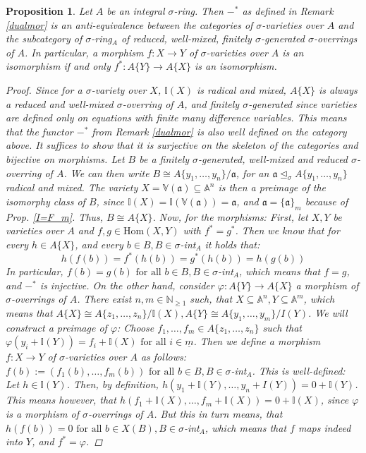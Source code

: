 \documentclass{article}
\def\I{\mathbb{I}}
\def\NE{\mathbb{N}_{\geq1}}
\def\VV{\mathbb{V}}
\def\a{\mathfrak{a}}
\def\s{\sigma}
\def\si{\unlhd_{\sigma}}
\def\Hom{\text{Hom}}
\def\fa{\text{ for all }}
\newenvironment{bew}{\begin{proof}[Proof]}{\end{proof}}
\theoremstyle{plain}
\newtheorem{prop}[Satz]{Proposition}
\theoremstyle{definition}
\begin{document}
\begin{prop}\label{dualisequiv}
Let $A$ be an integral $\s$-ring. Then $-^*$ as defined in Remark \ref{dualmor} is an anti-equivalence between the categories of $\s$-varieties over $A$ and the subcategory of $\s$-ring$_A$ of reduced, well-mixed, finitely $\s$-generated $\s$-overrings of $A$. 
In particular, a morphism $f: X \rightarrow Y$ of $\s$-varieties over $A$ is an isomorphism if and only $f^*: A\{Y\} \rightarrow A\{X\}$ is an isomorphism.
\begin{bew}
Since for a $\s$-variety over $X$, $\I(X)$ is radical and mixed, $A\{X\}$ is always a reduced and well-mixed $\s$-overring of $A$, 
and finitely $\s$-generated since varieties are defined only on equations with finite many difference variables. This means that the functor $-^*$ from Remark \ref{dualmor} is also well defined on the category above.
It suffices to show that it is surjective on the skeleton of the categories and bijective on morphisms. 
Let $B$ be a finitely $\s$-generated, well-mixed and reduced $\s$-overring of $A$. We can then write $B \cong A\{y_1,\ldots,y_n\}/\a$, for an $\a \si A\{y_1,\ldots,y_n\}$ radical and mixed. The variety $X = \VV(\a) \subseteq \mathbb{A}^n$
is then a preimage of the isomorphy class of $B$, since $\I(X) = \I(\VV(\a)) = \a$, and $\a = \{ \a \}_m$ because of Prop. \ref{I=F_m}. Thus, $B \cong A\{X\}$.
Now, for the morphisms: First, let $X,Y$ be varieties over $A$ and $f,g \in \Hom(X,Y)$ with $f^* = g^*$. Then we know that for every $h \in A\{X\}$, and every $b \in B, B \in \s$-int$_A$ it holds that:
\[ h(f(b)) = f^*(h(b)) = g^*(h(b)) = h(g(b)) \]
In particular, $f(b) = g(b) \fa b \in B, B \in \s$-int$_A$, which means that $f = g$, and $-^*$ is injective. 
On the other hand, consider $\varphi: A\{Y\} \rightarrow A\{X\}$ a morphism of $\s$-overrings of $A$. There exist $n,m \in \NE$ such, that $X \subseteq \mathbb{A}^n, Y \subseteq \mathbb{A}^m$,
 which means that $A\{X\} \cong A\{z_1,\ldots,z_n\}/\I(X), A\{Y\} \cong A\{y_1,\ldots,y_m\}/I(Y)$. We will construct a preimage of $\varphi$: Choose $f_1,\ldots,f_m \in A\{z_1,\ldots,z_n\}$ such that $\varphi(y_i + \I(Y)) = f_i + \I(X) \fa i \in \underline{m}$.
Then we define a morphism $f: X \rightarrow Y$ of $\s$-varieties over $A$ as follows: $f(b) := (f_1(b),\ldots,f_m(b)) \fa b \in B, B \in \s$-int$_A$. This is well-defined: Let $h \in \I(Y)$. Then, by definition, $h(y_1 + \I(Y),\ldots,y_n + I(Y)) = 0 + \I(Y)$.
This means however, that $h(f_1 + \I(X),\ldots,f_m + \I(X)) = 0 + \I(X)$, since $\varphi$ is a morphism of $\s$-overrings of $A$. But this in turn means, that $h(f(b)) = 0 \fa b \in X(B), B \in \s$-int$_A$, which means that $f$ maps indeed into $Y$, and $f^* = \varphi$.
\end{bew}
\end{prop}
\end{document}
